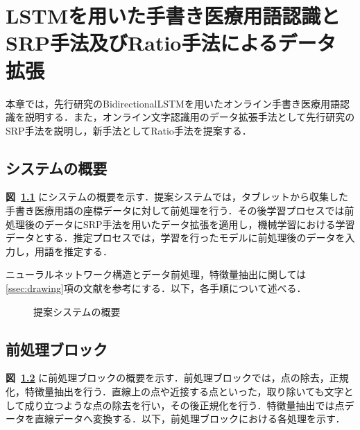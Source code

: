 
\chapter{LSTMを用いた手書き医療用語認識とSRP手法及びRatio手法によるデータ拡張}
\label{cha:propose}
本章では，先行研究のBidirectionalLSTMを用いたオンライン手書き医療用語認識を説明する．また，オンライン文字認識用のデータ拡張手法として先行研究のSRP手法を説明し，新手法としてRatio手法を提案する．
\section{システムの概要}
\label{sec:concept}
\textbf{図~\ref{sys_concept}} にシステムの概要を示す．提案システムでは，タブレットから収集した手書き医療用語の座標データに対して前処理を行う．その後学習プロセスでは前処理後のデータにSRP手法を用いたデータ拡張を適用し，機械学習における学習データとする．推定プロセスでは，学習を行ったモデルに前処理後のデータを入力し，用語を推定する．

ニューラルネットワーク構造とデータ前処理，特徴量抽出に関しては\ref{ssec:drawing}項の文献\cite{zhang18:drawing}を参考にする．以下，各手順について述べる．

\begin{figure}[tb]
 \begin{center}
  \caption{提案システムの概要}
  \label{sys_concept}
\end{center}
\end{figure}

\section{前処理ブロック}
\label{preprocess}
\textbf{図~\ref{preprocess}} に前処理ブロックの概要を示す．前処理ブロックでは，点の除去，正規化，特徴量抽出を行う．直線上の点や近接する点といった，取り除いても文字として成り立つような点の除去を行い，その後正規化を行う．特徴量抽出では点データを直線データへ変換する．以下，前処理ブロックにおける各処理を示す．

